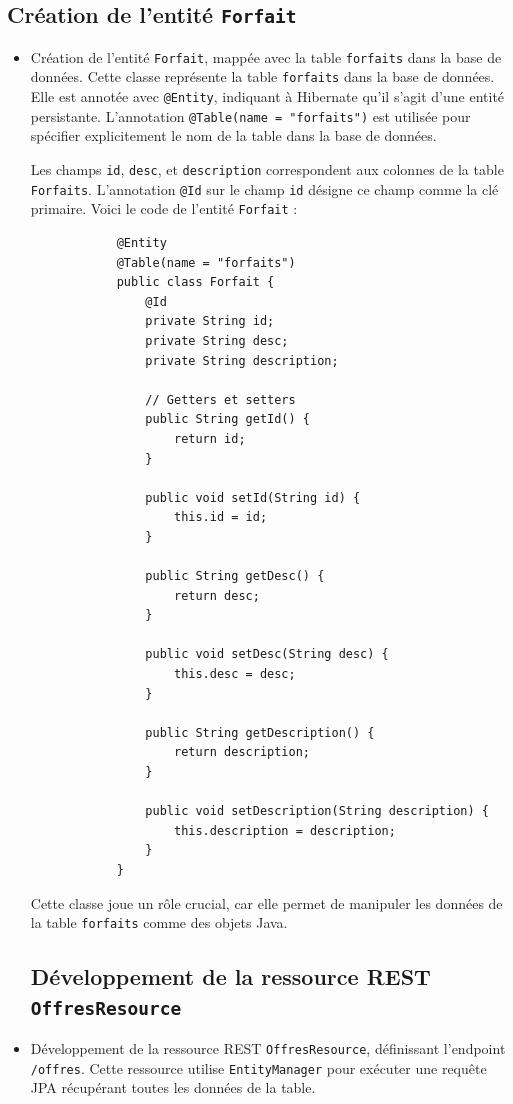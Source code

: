 \documentclass{article}
\begin{document}
	\subsection{Création de l'entité \texttt{Forfait}}
	\begin{itemize}
		\item Création de l'entité \texttt{Forfait}, mappée avec la table \texttt{forfaits} dans la base de données. Cette classe représente la table \texttt{forfaits} dans la base de données. Elle est annotée avec \texttt{@Entity}, indiquant à Hibernate qu'il s'agit d'une entité persistante. L'annotation \texttt{@Table(name = "forfaits")} est utilisée pour spécifier explicitement le nom de la table dans la base de données. 
		
		Les champs \texttt{id}, \texttt{desc}, et \texttt{description} correspondent aux colonnes de la table \texttt{Forfaits}. L'annotation \texttt{@Id} sur le champ \texttt{id} désigne ce champ comme la clé primaire.
		\newpage
		Voici le code de l'entité \texttt{Forfait} :
		\begin{lstlisting}
			@Entity
			@Table(name = "forfaits")
			public class Forfait {
				@Id
				private String id;
				private String desc;
				private String description;
				
				// Getters et setters
				public String getId() {
					return id;
				}
				
				public void setId(String id) {
					this.id = id;
				}
				
				public String getDesc() {
					return desc;
				}
				
				public void setDesc(String desc) {
					this.desc = desc;
				}
				
				public String getDescription() {
					return description;
				}
				
				public void setDescription(String description) {
					this.description = description;
				}
			}
		\end{lstlisting}
		
		Cette classe joue un rôle crucial, car elle permet de manipuler les données de la table \texttt{forfaits} comme des objets Java.
		\subsection{Développement de la ressource REST \texttt{OffresResource}}
		\item Développement de la ressource REST \texttt{OffresResource}, définissant l'endpoint \texttt{/offres}. Cette ressource utilise \texttt{EntityManager} pour exécuter une requête JPA récupérant toutes les données de la table.
	\end{itemize}
	
\end{document}
